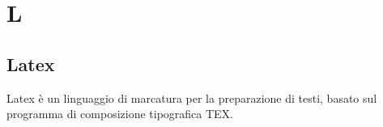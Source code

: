 \section{L}
\subsection{Latex}%
Latex è un linguaggio di marcatura per la preparazione di testi, basato sul programma di composizione tipografica TEX.
\clearpage